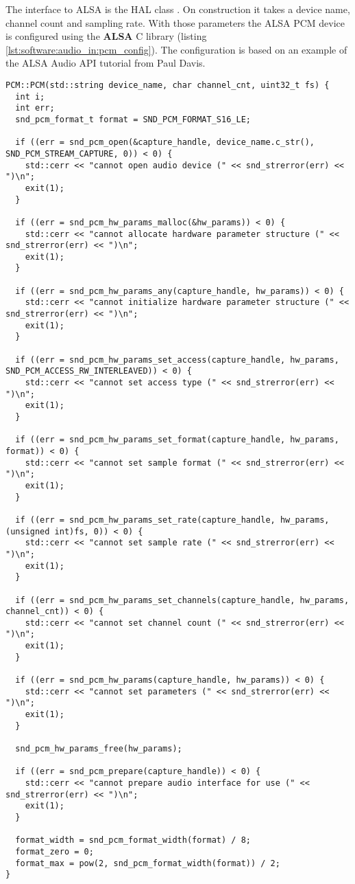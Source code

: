 The interface to ALSA is the HAL class . On construction it takes a device name, channel count and sampling rate. With those parameters the ALSA PCM device is configured using the \textbf{ALSA} C library (listing \ref{lst:software:audio_in:pcm_config}).\cite{noauthor_alsa_nodate} The configuration is based on an example of the ALSA Audio API tutorial from Paul Davis.\cite{davis_tutorial_2002}
%
\begin{mdframed}
\begin{lstlisting}[caption=ALSA interface configuration, label=lst:software:audio_in:pcm_config]
PCM::PCM(std::string device_name, char channel_cnt, uint32_t fs) {
  int i;
  int err;
  snd_pcm_format_t format = SND_PCM_FORMAT_S16_LE;

  if ((err = snd_pcm_open(&capture_handle, device_name.c_str(), SND_PCM_STREAM_CAPTURE, 0)) < 0) {
    std::cerr << "cannot open audio device (" << snd_strerror(err) << ")\n";
    exit(1);
  }

  if ((err = snd_pcm_hw_params_malloc(&hw_params)) < 0) {
    std::cerr << "cannot allocate hardware parameter structure (" << snd_strerror(err) << ")\n";
    exit(1);
  }

  if ((err = snd_pcm_hw_params_any(capture_handle, hw_params)) < 0) {
    std::cerr << "cannot initialize hardware parameter structure (" << snd_strerror(err) << ")\n";
    exit(1);
  }

  if ((err = snd_pcm_hw_params_set_access(capture_handle, hw_params, SND_PCM_ACCESS_RW_INTERLEAVED)) < 0) {
    std::cerr << "cannot set access type (" << snd_strerror(err) << ")\n";
    exit(1);
  }

  if ((err = snd_pcm_hw_params_set_format(capture_handle, hw_params, format)) < 0) {
    std::cerr << "cannot set sample format (" << snd_strerror(err) << ")\n";
    exit(1);
  }

  if ((err = snd_pcm_hw_params_set_rate(capture_handle, hw_params, (unsigned int)fs, 0)) < 0) {
    std::cerr << "cannot set sample rate (" << snd_strerror(err) << ")\n";
    exit(1);
  }

  if ((err = snd_pcm_hw_params_set_channels(capture_handle, hw_params, channel_cnt)) < 0) {
    std::cerr << "cannot set channel count (" << snd_strerror(err) << ")\n";
    exit(1);
  }

  if ((err = snd_pcm_hw_params(capture_handle, hw_params)) < 0) {
    std::cerr << "cannot set parameters (" << snd_strerror(err) << ")\n";
    exit(1);
  }

  snd_pcm_hw_params_free(hw_params);

  if ((err = snd_pcm_prepare(capture_handle)) < 0) {
    std::cerr << "cannot prepare audio interface for use (" << snd_strerror(err) << ")\n";
    exit(1);
  }

  format_width = snd_pcm_format_width(format) / 8;
  format_zero = 0;
  format_max = pow(2, snd_pcm_format_width(format)) / 2;
}
\end{lstlisting}
\end{mdframed}
